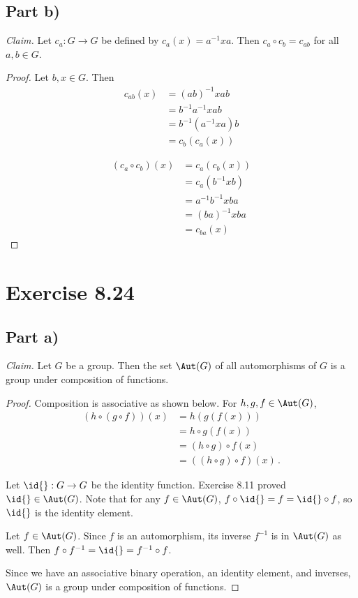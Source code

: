 \documentclass{abrice}
\newcommand{\Claim}{\emph{Claim.}\xspace}%
\begin{document}
\subsection{Part b)}

\Claim Let $c_a : G \to G$ be defined by $c_a(x) = a^{-1} x a$. Then $c_a \circ
c_b = c_{ab}$ for all $a,b \in G$.

\begin{proof}
  Let $b,x \in G$. Then
  \begin{align*}
    c_{ab}(x)
    &= {(ab)}^{-1} x ab \\
    &= b^{-1} a^{-1} x ab \\
    &= b^{-1}(a^{-1} x a) b \\
    &= c_b(c_a(x))
  \end{align*}

  \begin{align*}
    (c_a \circ c_b)(x)
    &= c_a(c_b(x)) \\
    &= c_a(b^{-1} x b) \\
    &= a^{-1} b^{-1} x b a \\
    &= {(ba)}^{-1} x ba \\
    &= c_{ba}(x)
  \end{align*}
\end{proof}

\section{Exercise 8.24}

\subsection{Part a)}

\Claim Let $G$ be a group. Then the set $\Aut(G)$ of all automorphisms of $G$ is
a group under composition of functions.

\begin{proof}
  Composition is associative as shown below. For $h,g,f \in \Aut(G)$,
  \begin{align*}
    (h \circ (g \circ f))(x)
    &= h(g(f(x))) \\
    &= h \circ g(f(x)) \\
    &= (h \circ g) \circ f(x) \\
    &= ((h \circ g) \circ f) (x)\, .
  \end{align*}

  Let $\id{} : G \to G$ be the identity function. Exercise 8.11 proved $\id{} \in
  \Aut(G)$. Note that for any $f \in \Aut(G)$, $f \circ \id{} = f = \id{} \circ f$,
  so $\id{}$ is the identity element.

  Let $f \in \Aut(G)$. Since $f$ is an automorphism, its inverse $f^{-1}$ is in
  $\Aut(G)$ as well. Then $f \circ f^{-1} = \id{} = f^{-1} \circ f$.

  Since we have an associative binary operation, an identity element, and
  inverses, $\Aut(G)$ is a group under composition of functions.
\end{proof}
\end{document}
